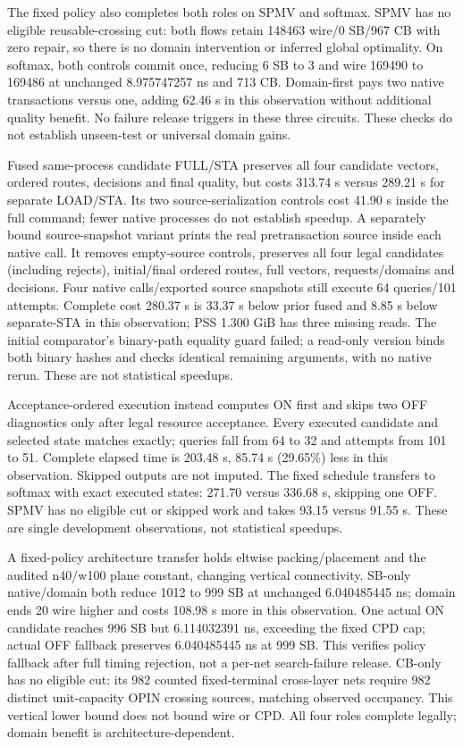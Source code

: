 \documentclass[conference,10pt]{IEEEtran}
\begin{document}
The fixed policy also completes both roles on SPMV and softmax. SPMV has no eligible reusable-crossing cut: both flows retain 148463 wire/0 SB/967 CB with zero repair, so there is no domain intervention or inferred global optimality. On softmax, both controls commit once, reducing 6 SB to 3 and wire 169490 to 169486 at unchanged 8.975747257 ns and 713 CB. Domain-first pays two native transactions versus one, adding 62.46 s in this observation without additional quality benefit. No failure release triggers in these three circuits. These checks do not establish unseen-test or universal domain gains.

Fused same-process candidate FULL/STA preserves all four candidate vectors, ordered routes, decisions and final quality, but costs 313.74 s versus 289.21 s for separate LOAD/STA. Its two source-serialization controls cost 41.90 s inside the full command; fewer native processes do not establish speedup. A separately bound source-snapshot variant prints the real pretransaction source inside each native call. It removes empty-source controls, preserves all four legal candidates (including rejects), initial/final ordered routes, full vectors, requests/domains and decisions. Four native calls/exported source snapshots still execute 64 queries/101 attempts. Complete cost 280.37 s is 33.37 s below prior fused and 8.85 s below separate-STA in this observation; PSS 1.300 GiB has three missing reads. The initial comparator's binary-path equality guard failed; a read-only version binds both binary hashes and checks identical remaining arguments, with no native rerun. These are not statistical speedups.

Acceptance-ordered execution instead computes ON first and skips two OFF diagnostics only after legal resource acceptance. Every executed candidate and selected state matches exactly; queries fall from 64 to 32 and attempts from 101 to 51. Complete elapsed time is 203.48 s, 85.74 s (29.65\%) less in this observation. Skipped outputs are not imputed. The fixed schedule transfers to softmax with exact executed states: 271.70 versus 336.68 s, skipping one OFF. SPMV has no eligible cut or skipped work and takes 93.15 versus 91.55 s. These are single development observations, not statistical speedups.

A fixed-policy architecture transfer holds eltwise packing/placement and the audited n40/w100 plane constant, changing vertical connectivity. SB-only native/domain both reduce 1012 to 999 SB at unchanged 6.040485445 ns; domain ends 20 wire higher and costs 108.98 s more in this observation. One actual ON candidate reaches 996 SB but 6.114032391 ns, exceeding the fixed CPD cap; actual OFF fallback preserves 6.040485445 ns at 999 SB. This verifies policy fallback after full timing rejection, not a per-net search-failure release. CB-only has no eligible cut: its 982 counted fixed-terminal cross-layer nets require 982 distinct unit-capacity OPIN crossing sources, matching observed occupancy. This vertical lower bound does not bound wire or CPD. All four roles complete legally; domain benefit is architecture-dependent.
\end{document}
